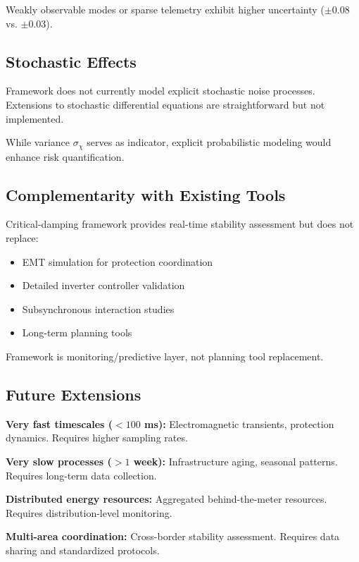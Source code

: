 \documentclass[11pt,letterpaper]{article}
\newcommand{\symchi}{\chi}
\begin{document}
Weakly observable modes or sparse telemetry exhibit higher uncertainty ($\pm 0.08$ vs. $\pm 0.03$).

\subsection{Stochastic Effects}

Framework does not currently model explicit stochastic noise processes. Extensions to stochastic differential equations are straightforward but not implemented.

While variance $\sigma_\symchi$ serves as indicator, explicit probabilistic modeling would enhance risk quantification.

\subsection{Complementarity with Existing Tools}

Critical-damping framework provides real-time stability assessment but does not replace:
\begin{itemize}
\item EMT simulation for protection coordination
\item Detailed inverter controller validation
\item Subsynchronous interaction studies
\item Long-term planning tools
\end{itemize}

Framework is monitoring/predictive layer, not planning tool replacement.

\subsection{Future Extensions}

\textbf{Very fast timescales ($< 100$ ms):} Electromagnetic transients, protection dynamics. Requires higher sampling rates.

\textbf{Very slow processes ($> 1$ week):} Infrastructure aging, seasonal patterns. Requires long-term data collection.

\textbf{Distributed energy resources:} Aggregated behind-the-meter resources. Requires distribution-level monitoring.

\textbf{Multi-area coordination:} Cross-border stability assessment. Requires data sharing and standardized protocols.
\end{document}
